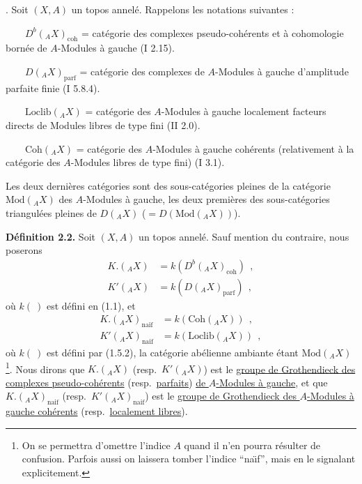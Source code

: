 . Soit $(X, A)$ un topos annel\'{e}. Rappelons les notations suivantes :

$\qquad D^b({}_A X)_{\mathrm{coh}}$ = cat\'{e}gorie des complexes pseudo-coh\'{e}rents et \`{a} cohomologie born\'{e}e de $A$-Modules \`{a} gauche (I 2.15).

$\qquad D({}_A X)_{\mathrm{parf}}$ = cat\'{e}gorie des complexes de $A$-Modules \`{a} gauche d'amplitude parfaite finie (I 5.8.4).

$\qquad \mathrm{Loclib}({}_A X)$ = cat\'{e}gorie des $A$-Modules \`{a} gauche localement facteurs directs de Modules libres de type fini (II 2.0).

$\qquad \mathrm{Coh}({}_A X)$ = cat\'{e}gorie des $A$-Modules \`{a} gauche coh\'{e}rents (relativement \`{a} la cat\'{e}gorie des $A$-Modules libres de type fini) (I 3.1).

Les deux derni\`{e}res cat\'{e}gories sont des sous-cat\'{e}gories pleines de la cat\'{e}gorie $\mathrm{Mod}({}_A X)$ des $A$-Modules \`{a} gauche, les deux premi\`{e}res des sous-cat\'{e}gories triangul\'{e}es pleines de $D({}_A X)$ ($= D(\mathrm{Mod}({}_A X))$).

\medskip

\noindent\textbf{D\'{e}finition 2.2.} Soit $(X, A)$ un topos annel\'{e}. Sauf mention du contraire, nous poserons
\begin{align*}
K.({}_A X) &= k(D^b({}_A X)_{\mathrm{coh}})\ \ , \\
K'({}_A X) &= k(D({}_A X)_{\mathrm{parf}})\ \ ,
\end{align*}
o\`{u} $k(\ )$ est d\'{e}fini en (1.1), et
\begin{align*}
K.({}_A X)_{\mathrm{naif}} &= k(\mathrm{Coh}({}_A X))\ \ , \\
K'({}_A X)_{\mathrm{naif}} &= k(\mathrm{Loclib}({}_A X))\ \ ,
\end{align*}
o\`{u} $k(\ )$ est d\'{e}fini par (1.5.2), la cat\'{e}gorie ab\'{e}lienne ambiante \'{e}tant $\mathrm{Mod}({}_A X)$\footnote{On se permettra d'omettre l'indice $A$ quand il n'en pourra r\'{e}sulter de confusion. Parfois aussi on laissera tomber l'indice ``na\"{\i}f'', mais en le signalant explicitement.}. Nous dirons que $K.({}_A X)$ (resp.\ $K'({}_A X)$) est le \underline{groupe de Grothendieck des complexes pseudo-coh\'{e}rents} (resp.\ \underline{parfaits}) \underline{de $A$-Modules \`{a} gauche}, et que $K.({}_A X)_{\mathrm{naif}}$ (resp.\ $K'({}_A X)_{\mathrm{naif}}$) est le \underline{groupe de Grothendieck des $A$-Modules \`{a} gauche coh\'{e}rents} (resp.\ \underline{localement libres}).

